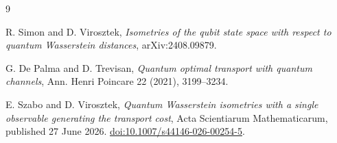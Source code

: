 \documentclass[11pt]{amsart}
\begin{document}
\begin{thebibliography}{9}

R. Simon and D. Virosztek,
\emph{Isometries of the qubit state space with respect to quantum Wasserstein
distances},
arXiv:2408.09879.

G. De Palma and D. Trevisan,
\emph{Quantum optimal transport with quantum channels},
Ann. Henri Poincare 22 (2021), 3199--3234.

E. Szabo and D. Virosztek,
\emph{Quantum Wasserstein isometries with a single observable generating the
transport cost},
Acta Scientiarum Mathematicarum, published 27 June 2026.
\href{https://doi.org/10.1007/s44146-026-00254-5}{doi:10.1007/s44146-026-00254-5}.

\end{thebibliography}
\end{document}
